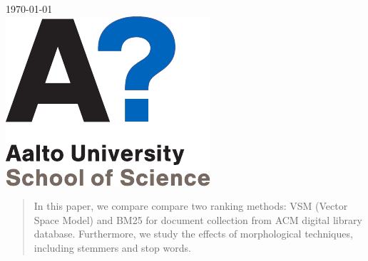\begin{titlepage}


{\large \today}\\[2cm] %


\includegraphics{AaltoSCI_EN_9.pdf}\\[1cm] %
 

\vfill %



\end{titlepage}


\begin{abstract}
In this paper, we compare compare two ranking methods: VSM (Vector Space Model) and BM25 for document collection from ACM digital library database. Furthermore, we study the effects of morphological techniques, including stemmers and stop words.
\end{abstract}

